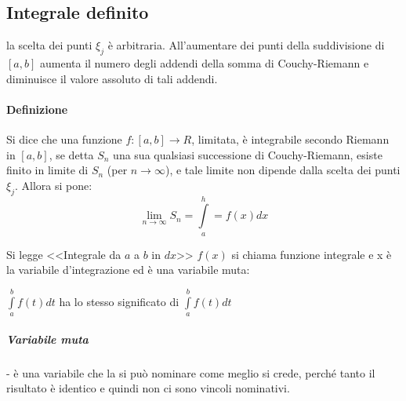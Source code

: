 \documentclass{book}
\begin{document}
\subsection{Integrale definito}
la scelta dei punti $\xi_j$ è arbitraria. All'aumentare dei punti della suddivisione di $[a,b]$ aumenta il numero degli addendi della somma di Couchy-Riemann e diminuisce il valore assoluto di tali addendi.
\paragraph{Definizione}
Si dice che una funzione $f:[a,b]\to R$, limitata, è integrabile secondo Riemann in $[a,b]$, se detta $S_n$ una sua qualsiasi successione di Couchy-Riemann, esiste finito in limite di $S_n$ (per $n\to \infty$), e tale limite non dipende dalla scelta dei punti $\xi_j$. Allora si pone:
\begin{equation*}
	\lim_{n\to\infty}S_n=\int\limits^h_a=f(x)dx
\end{equation*}

Si legge <<Integrale da $a$ a $b$ in $dx$>> $f(x)$ si chiama funzione integrale e x è la variabile d'integrazione ed è una variabile muta:
\begin{center}
	$\int\limits^b_af(t)dt$ ha lo stesso significato di $\int\limits^b_af(t)dt$ 
\end{center}
\subparagraph{Variabile muta} - è una variabile che la si può nominare come meglio si crede, perché tanto il risultato è identico e quindi non ci sono vincoli nominativi.
\end{document}
